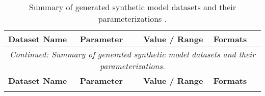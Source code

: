 \begin{longtable}{@{}llll@{}}
\caption[Summary of generated synthetic model datasets and their parameterizations.]{Summary of generated synthetic model datasets and their parameterizations \cite{aras_synthetic_2025}.}
\label{tab:syn_datasets_overview}\\
\toprule
\textbf{Dataset Name} & \textbf{Parameter} & \textbf{Value / Range} & \textbf{Formats} \\* \midrule
\endfirsthead
\multicolumn{4}{c}{\textit{Continued: Summary of generated synthetic model datasets and their parameterizations.}}\\
\toprule
\textbf{Dataset Name} & \textbf{Parameter} & \textbf{Value / Range} & \textbf{Formats} \\* \midrule
\endhead
%
\bottomrule
\endfoot
%
\endlastfoot


\end{longtable}
